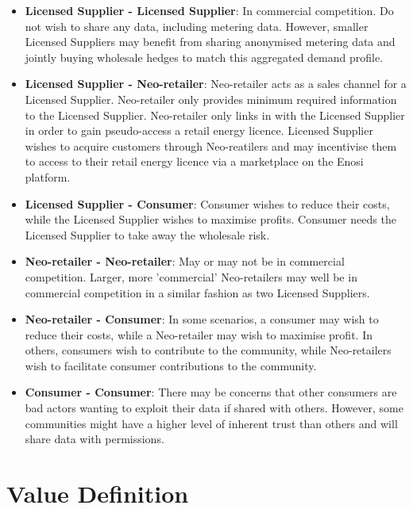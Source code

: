 \documentclass{article}
\theoremstyle{definition}
\theoremstyle{plain} %
\begin{document}
\begin{itemize}

\item{ \textbf{Licensed Supplier - Licensed Supplier}:
In commercial competition. Do not wish to share any data, including metering data. However, smaller Licensed Suppliers may benefit from sharing anonymised metering data and jointly buying wholesale hedges to match this aggregated demand profile.}

\item{ \textbf{Licensed Supplier - Neo-retailer}:
Neo-retailer acts as a sales channel for a Licensed Supplier. Neo-retailer only provides minimum required information to the Licensed Supplier. Neo-retailer only links in with the Licensed Supplier in order to gain pseudo-access a retail energy licence. Licensed Supplier wishes to acquire customers through Neo-reatilers and may incentivise them to access to their retail energy licence via a marketplace on the Enosi platform.}

\item{ \textbf{Licensed Supplier - Consumer}:
Consumer wishes to reduce their costs, while the Licensed Supplier wishes to maximise profits. Consumer needs the Licensed Supplier to take away the wholesale risk.}

\item{ \textbf{Neo-retailer - Neo-retailer}:
May or may not be in commercial competition. Larger, more 'commercial' Neo-retailers may well be in commercial competition in a similar fashion as two Licensed Suppliers.}

\item{ \textbf{Neo-retailer - Consumer}:
In some scenarios, a consumer may wish to reduce their costs, while a Neo-retailer may wish to maximise profit. In others, consumers wish to contribute to the community, while Neo-retailers wish to facilitate consumer contributions to the community.}

\item{ \textbf{Consumer - Consumer}:
There may be concerns that other consumers are bad actors wanting to exploit their data if shared with others. However, some communities might have a higher level of inherent trust than others and will share data with permissions.}

\end{itemize}



\pagebreak
\section{Value Definition}
\end{document}
